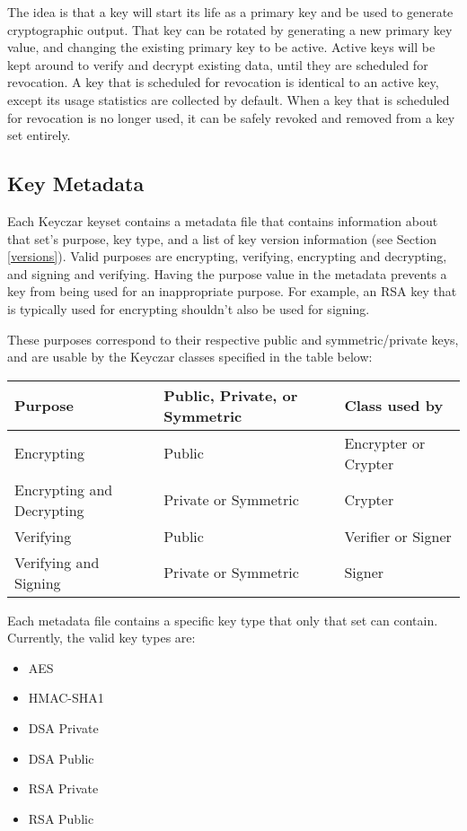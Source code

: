 \documentclass{llncs}
\begin{document}
The idea is that a key will start its life as a primary key and be used to
generate cryptographic output. That key can be rotated by generating a new
primary key value, and changing the existing primary key to be active. Active
keys will be kept around to verify and decrypt existing data, until they are
scheduled for revocation. A key that is scheduled for revocation is identical
to an active key, except its usage statistics are collected by default. When a
key that is scheduled for revocation is no longer used, it can be safely
revoked and removed from a key set entirely.

\subsection{Key Metadata}\label{metadata}

Each Keyczar keyset contains a metadata file that contains information about
that set's purpose, key type, and a list of key version information (see
Section \ref{versions}). Valid purposes are encrypting, verifying, encrypting
and decrypting, and signing and verifying. Having the purpose value in the
metadata prevents a key from being used for an inappropriate purpose. For
example, an RSA key that is typically used for encrypting shouldn't also be
used for signing.

These purposes correspond to their respective public and symmetric/private
keys, and are usable by the Keyczar classes specified in the table below: 



\begin{tabular}{ l | l | l }
{\bf Purpose} &  {\bf Public, Private, or Symmetric } & {\bf Class used by} \\
\hline Encrypting & Public & Encrypter or Crypter \\ \hline
Encrypting and Decrypting & Private or Symmetric & Crypter \\ \hline
Verifying & Public & Verifier or Signer \\ \hline 
Verifying and Signing & Private or Symmetric & Signer \\ \hline
\end{tabular}

Each metadata file contains a specific key type that only that set can contain.
Currently, the valid key types are:
\begin{itemize}
  \item AES
  \item HMAC-SHA1
  \item DSA Private
  \item DSA Public
  \item RSA Private
  \item RSA Public
\end{itemize}
\end{document}

